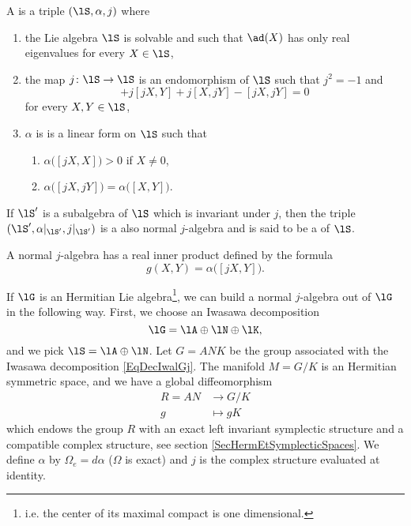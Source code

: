 \begin{definition}
    A  is a triple $(\lS,\alpha,j)$ where
    \begin{enumerate}

        \item
            the Lie algebra $\lS$ is solvable and such that $\ad(X)$ has only real eigenvalues for every $X\in\lS$,
        \item
            the map $j\colon \lS\to \lS$ is an endomorphism of $\lS$ such that $j^2=-1$ and
            \begin{equation}
                [X,Y]+j[jX,Y]+j[X,jY]-[jX,jY]=0
            \end{equation}
            for every $X,Y\in\lS$,
        \item
            $\alpha$ is is  a linear form on $\lS$ such that
            \begin{enumerate}
                \item
                    $\alpha\big( [jX,X] \big)>0$ if $X\neq 0$,
                \item
                    $\alpha\big( [jX,jY] \big)=\alpha\big( [X,Y] \big)$.
            \end{enumerate}

    \end{enumerate} 
\end{definition}

If $\lS'$ is a subalgebra of $\lS$ which is invariant under $j$, then the triple $(\lS',\alpha|_{\lS'},j|_{\lS'})$ is a also normal $j$-algebra and is said to be a  of $\lS$.

A normal $j$-algebra has a real inner product defined by the formula
\begin{equation}
    g(X,Y)=\alpha\big( [jX,Y] \big).
\end{equation}

If $\lG$ is an Hermitian Lie algebra\footnote{i.e. the center of its maximal compact is one dimensional.}, we can build a normal $j$-algebra out of $\lG$ in the following way. First, we choose an Iwasawa decomposition
\begin{equation}            \label{EqDecIwalGj}
    \lG=\lA\oplus\lN\oplus\lK,
\end{equation}
and we pick $\lS=\lA\oplus\lN$. Let $G=ANK$ be the group associated with the Iwasawa decomposition \eqref{EqDecIwalGj}. The manifold $M=G/K$ is an Hermitian symmetric space, and we have a global diffeomorphism
\begin{equation}
    \begin{aligned}
        R=AN&\to G/K \\
        g&\mapsto gK 
    \end{aligned}
\end{equation}
which endows the group $R$ with an exact left invariant symplectic structure and a compatible complex structure, see section \ref{SecHermEtSymplecticSpaces}. We define $\alpha$ by $\Omega_e=d\alpha$ ($\Omega$ is exact) and $j$ is the complex structure evaluated at identity.


